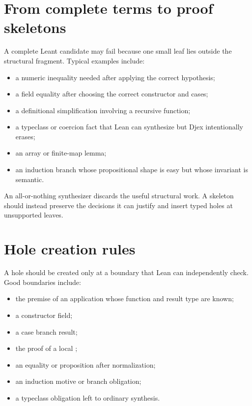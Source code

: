 \documentclass[11pt,letterpaper,openany]{report}
\newcommand{\code}[1]{\texttt{\detokenize{#1}}}
\begin{document}
\section{From complete terms to proof skeletons}

A complete Leant candidate may fail because one small leaf lies outside the structural
fragment. Typical examples include:

\begin{itemize}
  \item a numeric inequality needed after applying the correct hypothesis;
  \item a field equality after choosing the correct constructor and cases;
  \item a definitional simplification involving a recursive function;
  \item a typeclass or coercion fact that Lean can synthesize but Djex intentionally
        erases;
  \item an array or finite-map lemma;
  \item an induction branch whose propositional shape is easy but whose invariant is
        semantic.
\end{itemize}

An all-or-nothing synthesizer discards the useful structural work. A skeleton should
instead preserve the decisions it can justify and insert typed holes at unsupported
leaves.

\section{Hole creation rules}

A hole should be created only at a boundary that Lean can independently check. Good
boundaries include:

\begin{itemize}
  \item the premise of an application whose function and result type are known;
  \item a constructor field;
  \item a case branch result;
  \item the proof of a local \code{have};
  \item an equality or proposition after normalization;
  \item an induction motive or branch obligation;
  \item a typeclass obligation left to ordinary synthesis.
\end{itemize}
\end{document}
